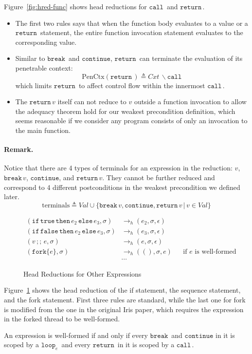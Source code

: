 \documentclass{article}
\numberwithin{algorithm}{section}
\newcommand{\true}{\texttt{true}}
\newcommand{\false}{\texttt{false}}
\newcommand{\cmdfork}[1]{\texttt{fork}\{#1\}}
\newcommand{\cmdloop}[1]{\texttt{loop}_{#1}\,}
\newcommand{\cmdbreak}{\texttt{break}\,}
\newcommand{\cmdcontinue}{\texttt{continue}}
\newcommand{\cmdreturn}{\texttt{return}\,}
\newcommand{\cmdif}{\texttt{if}\,}
\newcommand{\cmdthen}{\,\texttt{then}\,}
\newcommand{\cmdelse}{\,\texttt{else}\,}
\newcommand{\cmdseq}{\,;;\,}
\newcommand{\cmdcall}{\texttt{call}\,}
\newcommand{\pure}[1]{\text{PenCtx}(#1)}
\newcommand{\hred}{\rightarrow_h}
\newcommand{\sep}{\,|\,}
\begin{document}
Figure~\ref{fig:hred-func} shows head reductions for $\cmdcall\!$ and $\cmdreturn\!$.
\begin{itemize}
\item The first two rules says that when the function body evaluates to a value or a $\cmdreturn\!$ statement, the entire function invocation statement evaluates to the corresponding value.
\item Similar to $\cmdbreak\!$ and $\cmdcontinue$, $\cmdreturn\!$ can terminate the evaluation of its penetrable context:
$$
\pure{\cmdreturn\!} \triangleq \textit{Cxt}\,\backslash\cmdcall
$$
which limits $\cmdreturn\!$ to affect control flow within the innermost $\cmdcall\!$.
\item The $\cmdreturn v$ itself can not reduce to $v$ outside a function invocation to allow the adequacy theorem hold for our weakest precondition definition, which seems reasonable if we consider any program consists of only an invocation to the main function.
\end{itemize}

\paragraph{Remark.} Notice that there are 4 types of terminals for an expression in the reduction: $v$, $\cmdbreak v$, $\cmdcontinue$, and $\cmdreturn v$.
They cannot be further reduced and correspond to 4 different postconditions in the weakest precondition we defined later.
$$
\text{terminals} \triangleq \textit{Val} \cup \{\cmdbreak v, \cmdcontinue, \cmdreturn v \sep v \in \textit{Val}\}
$$

\begin{figure}[h]
$$
\begin{aligned}
    (\cmdif \true \cmdthen e_2 \cmdelse e_3, \sigma) &\hred (e_2, \sigma, \epsilon) && \\
    (\cmdif \false \cmdthen e_2 \cmdelse e_3, \sigma) &\hred (e_3, \sigma, \epsilon) && \\
    (v \cmdseq e, \sigma) &\hred (e, \sigma, \epsilon) && \\
    (\cmdfork{e}, \sigma) &\hred ((), \sigma, e) && \text{if $e$ is well-formed} \\
    &\cdots
\end{aligned}
$$
\caption{Head Reductions for Other Expressions}
\label{fig:hred-other}
\end{figure}

Figure~\ref{fig:hred-other} shows the head reduction of the if statement, the sequence statement, and the fork statement.
First three rules are standard, while the last one for fork is modified from the one in the original Iris paper, which requires the expression in the forked thread to be well-formed.
\begin{definition}
    An expression is well-formed if and only if every $\cmdbreak\!$ and $\cmdcontinue$ in it is scoped by a $\cmdloop{e}\!$ and every $\cmdreturn\!$ in it is scoped by a $\cmdcall\!$.    
\end{definition}
\end{document}
